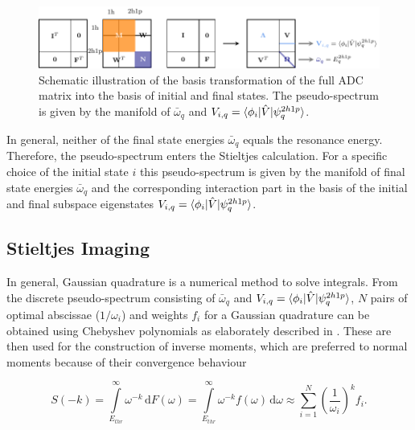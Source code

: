 \begin{figure}[h]
  \centering
  \includegraphics[scale=1.0]{pics/fano_bastrans_pgf.pdf}
  \caption{Schematic illustration of the basis transformation of the full ADC
           matrix into the basis of initial and final states. The pseudo-spectrum
           is given by the manifold of $\bar{\omega}_q$ and
           $V_{i,q} = \braket{\phi_i |\hat{V}| \psi_{q}^{2h1p}}$.}
  \label{figure:fano_bastrans}                                        
\end{figure}

In general, neither of the final state energies $\bar{\omega}_q$
equals the resonance energy. Therefore, the pseudo-spectrum enters
the Stieltjes calculation.
For a specific choice of the initial state $i$
this pseudo-spectrum is given by the
manifold of final state energies                                      
$\bar{\omega}_q$ and the corresponding interaction part in the        
basis of the initial and                                              
final subspace eigenstates                                                     
$V_{i,q} = \braket{\phi_i |\hat{V}| \psi_{q}^{2h1p}}$.




\subsection{Stieltjes Imaging}
In general, Gaussian quadrature is a numerical method to solve integrals.
From the discrete pseudo-spectrum consisting of $\bar{\omega}_q$
and $V_{i,q} = \braket{\phi_i |\hat{V}| \psi_{q}^{2h1p}}$,
$N$ pairs of optimal abscissae ($1/\omega_i$)
and weights $f_i$ for a Gaussian quadrature can be obtained using
Chebyshev polynomials as elaborately described in \cite{MuellerPlathe90}.
These are then used for the construction of inverse moments, which
are preferred to normal moments because of their convergence behaviour

\begin{equation}
  S(-k) = \int\limits_{E_{thr}}^{\infty} \omega^{-k} \, \mathrm{d}F(\omega)
       = \int\limits_{E_{thr}}^{\infty} \omega^{-k} f(\omega) \, \mathrm{d}\omega
       \approx \sum\limits_{i=1}^N \left(\frac{1}{{\omega}_i}\right)^k f_i .
\end{equation}

